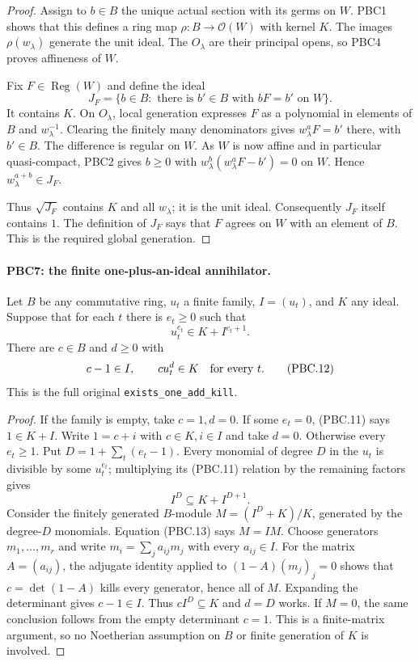 \begin{proof}
Assign to $b\in B$ the unique actual section with its germs on
$W$.  PBC1 shows that this defines a ring map
$\rho:B\to\mathcal O(W)$ with kernel $K$.
The images $\rho(w_\lambda)$ generate the unit ideal.  The
$O_\lambda$ are their principal opens, so PBC4 proves affineness
of $W$.

Fix $F\in\operatorname{Reg}(W)$ and define the ideal
\[
 J_F=\{b\in B:\text{ there is }b'\in B
                  \text{ with }bF=b'\text{ on }W\}.
                                                        \tag{PBC.10}
\]
It contains $K$.  On $O_\lambda$, local generation expresses
$F$ as a polynomial in elements of $B$ and $w_\lambda^{-1}$.
Clearing the finitely many denominators gives
$w_\lambda^aF=b'$ there, with $b'\in B$.
The difference is regular on $W$.  As $W$ is now affine and in
particular quasi-compact, PBC2 gives $b\ge0$ with
$w_\lambda^b(w_\lambda^aF-b')=0$ on $W$.
Hence $w_\lambda^{a+b}\in J_F$.

Thus $\sqrt{J_F}$ contains $K$ and all $w_\lambda$; it is the
unit ideal.  Consequently $J_F$ itself contains $1$.
The definition of $J_F$ says that $F$ agrees on $W$ with an
element of $B$.  This is the required global generation.
\end{proof}

\paragraph{PBC7: the finite one-plus-an-ideal annihilator.}
\label{claim:PBC7}
Let $B$ be any commutative ring, $u_t$ a finite family,
$I=(u_t)$, and $K$ any ideal.  Suppose that for each $t$ there is
$e_t\ge0$ such that
\[
 u_t^{e_t}\in K+I^{e_t+1}.
                                                        \tag{PBC.11}
\]
There are $c\in B$ and $d\ge0$ with
\[
 c-1\in I,\qquad c u_t^d\in K\quad\hbox{for every }t.
                                                        \tag{PBC.12}
\]
This is the full original \texttt{exists\_one\_add\_kill}.

\begin{proof}
If the family is empty, take $c=1,d=0$.  If some $e_t=0$,
(PBC.11) says $1\in K+I$.  Write $1=c+i$ with $c\in K,i\in I$
and take $d=0$.
Otherwise every $e_t\ge1$.  Put
$D=1+\sum_t(e_t-1)$.  Every monomial of degree $D$ in the
$u_t$ is divisible by some $u_t^{e_t}$; multiplying its
(PBC.11) relation by the remaining factors gives
\[
 I^D\subseteq K+I^{D+1}.
                                                        \tag{PBC.13}
\]
Consider the finitely generated $B$-module
$M=(I^D+K)/K$, generated by the degree-$D$ monomials.
Equation (PBC.13) says $M=IM$.
Choose generators $m_1,\ldots,m_r$ and write
$m_i=\sum_j a_{ij}m_j$ with every $a_{ij}\in I$.
For the matrix $A=(a_{ij})$, the adjugate identity applied to
$(1-A)(m_j)_j=0$ shows that
$c=\det(1-A)$ kills every generator, hence all of $M$.
Expanding the determinant gives $c-1\in I$.
Thus $cI^D\subseteq K$ and $d=D$ works.
If $M=0$, the same conclusion follows from the empty determinant
$c=1$.  This is a finite-matrix argument, so no Noetherian
assumption on $B$ or finite generation of $K$ is involved.
\end{proof}

